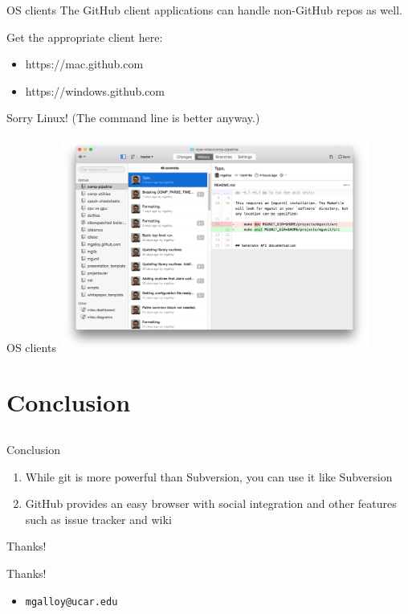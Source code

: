 \documentclass{beamer}
\begin{document}
\begin{frame}{OS clients}
The GitHub client applications can handle non-GitHub repos as well.

\vspace{1em}

Get the appropriate client here:
  \begin{itemize}
    \item https://mac.github.com
    \item https://windows.github.com
  \end{itemize}
Sorry Linux! (The command line is better anyway.)
\end{frame}

\begin{frame}{OS clients}
  \includegraphics[width=4in]{mac-client.png}
\end{frame}


\section{Conclusion}
\subsection*{}

\begin{frame}{Conclusion}
  \begin{enumerate}
    \item While git is more powerful than Subversion, you can use it like Subversion
    \item GitHub provides an easy browser with social integration and other features such as issue tracker and wiki
  \end{enumerate}
\end{frame}

\begin{frame}{Thanks!}
  \begin{center}{\huge Thanks!}\end{center}
  \begin{itemize}
    \item {\tt mgalloy@ucar.edu}
  \end{itemize}
\end{frame}
\end{document}
